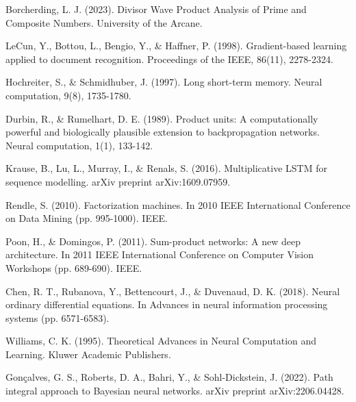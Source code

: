 \documentclass{article}
\begin{document}
\begin{thebibliography}{9}

Borcherding, L. J. (2023). Divisor Wave Product Analysis of Prime and Composite Numbers. University of the Arcane.

LeCun, Y., Bottou, L., Bengio, Y., \& Haffner, P. (1998). Gradient-based learning applied to document recognition. Proceedings of the IEEE, 86(11), 2278-2324.

Hochreiter, S., \& Schmidhuber, J. (1997). Long short-term memory. Neural computation, 9(8), 1735-1780.

Durbin, R., \& Rumelhart, D. E. (1989). Product units: A computationally powerful and biologically plausible extension to backpropagation networks. Neural computation, 1(1), 133-142.

Krause, B., Lu, L., Murray, I., \& Renals, S. (2016). Multiplicative LSTM for sequence modelling. arXiv preprint arXiv:1609.07959.

Rendle, S. (2010). Factorization machines. In 2010 IEEE International Conference on Data Mining (pp. 995-1000). IEEE.

Poon, H., \& Domingos, P. (2011). Sum-product networks: A new deep architecture. In 2011 IEEE International Conference on Computer Vision Workshops (pp. 689-690). IEEE.

Chen, R. T., Rubanova, Y., Bettencourt, J., \& Duvenaud, D. K. (2018). Neural ordinary differential equations. In Advances in neural information processing systems (pp. 6571-6583).

Williams, C. K. (1995). Theoretical Advances in Neural Computation and Learning. Kluwer Academic Publishers.

Gonçalves, G. S., Roberts, D. A., Bahri, Y., \& Sohl-Dickstein, J. (2022). Path integral approach to Bayesian neural networks. arXiv preprint arXiv:2206.04428.

\end{thebibliography}
\end{document}
